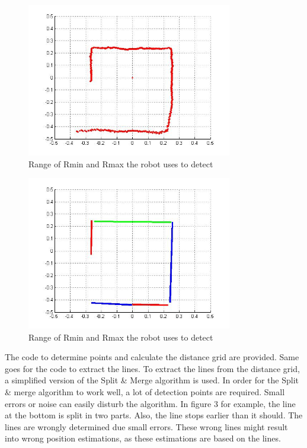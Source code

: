 \documentclass[12pt]{article}
\begin{document}
\begin{figure}[H]
	\centering
	\includegraphics[width=0.8\textwidth]{grid.jpg}
	\caption{Range of Rmin and Rmax the robot uses to detect}
\end{figure}

\begin{figure}[H]
	\centering
	\includegraphics[width=0.8\textwidth]{lines.jpg}
	\caption{Range of Rmin and Rmax the robot uses to detect}
\end{figure}

The code to determine points and calculate the distance grid are provided. Same goes for the code to extract the lines. To extract the lines from the distance grid, a simplified version of the Split \& Merge algorithm is used. In order for the Split \& merge algorithm to work well, a lot of detection points are required. Small errors or noise can easily disturb the algorithm. In figure 3 for example, the line at the bottom is split in two parts. Also, the line stops earlier than it should. The lines are wrongly determined due small errors. These wrong lines might result into wrong position estimations, as these estimations are based on the lines.
\end{document}
